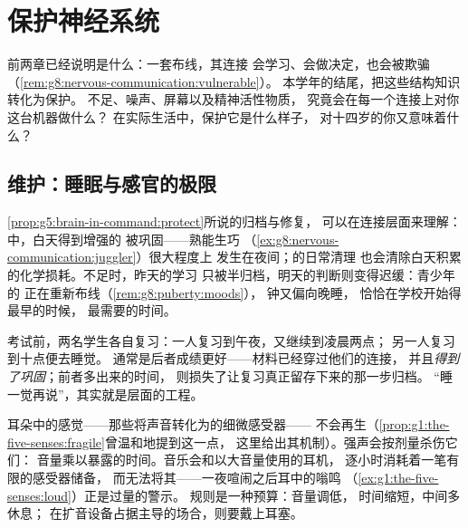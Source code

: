 \chapter{保护神经系统}\label{ch:g8:protecting-the-nervous-system}

前两章已经说明是什么：一套布线，其连接
会学习、会做决定，也会被欺骗
（\cref{rem:g8:nervous-communication:vulnerable}）。
本学年的结尾，把这些结构知识转化为保护。
不足、噪声、屏幕以及精神活性物质，
究竟会在每一个连接上对你这台机器做什么？
在实际生活中，保护它是什么样子，
对十四岁的你又意味着什么？

\section{维护：睡眠与感官的极限}

\begin{proposition}[睡眠即突触维护]\label{prop:g8:protecting-the-nervous-system:sleep}
\cref{prop:g5:brain-in-command:protect}所说的归档与修复，
可以在连接层面来理解：中，白天得到增强的
被巩固——熟能生巧
（\cref{ex:g8:nervous-communication:juggler}）很大程度上
发生在夜间；的日常清理
也会清除白天积累的化学损耗。不足时，昨天的学习
只被半归档，明天的判断则变得迟缓：青少年的
正在重新布线（\cref{rem:g8:puberty:moods}），
钟又偏向晚睡，
恰恰在学校开始得最早的时候，
最需要的时间。
\end{proposition}
\admitted

\begin{example}[复习的悖论]\label{ex:g8:protecting-the-nervous-system:revision}
考试前，两名学生各自复习：一人复习到午夜，又继续到凌晨两点；
另一人复习到十点便去睡觉。
通常是后者成绩更好——材料已经穿过他们的连接，
并且\emph{得到了巩固}；前者多出来的时间，
则损失了让复习真正留存下来的那一步归档。
“睡一觉再说”，其实就是层面的工程。
\end{example}

\begin{proposition}[声音过响即是剂量]\label{prop:g8:protecting-the-nervous-system:noise}
耳朵中的感觉——那些将声音转化为的细微感受器——
不会再生（\cref{prop:g1:the-five-senses:fragile}曾温和地提到这一点，
这里给出其机制）。强声会按剂量杀伤它们：
音量乘以暴露的时间。音乐会和以大音量使用的耳机，
逐小时消耗着一笔有限的感受器储备，
而无法将其——一夜喧闹之后耳中的嗡鸣
（\cref{ex:g1:the-five-senses:loud}）正是过量的警示。
规则是一种预算：音量调低，
时间缩短，中间多休息；
在扩音设备占据主导的场合，则要戴上耳塞。
\end{proposition}
\admitted

